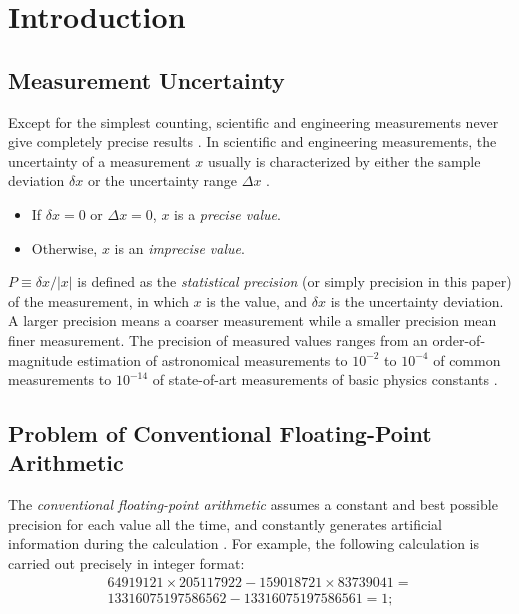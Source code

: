 \documentclass[twoside]{article}
\numberwithin{equation}{section}
\begin{document}
\clearpage
\section{Introduction}
\label{sec: introduction}

\subsection{Measurement Uncertainty \cite{Prev_Precision_Arithmetic}}

Except for the simplest counting, scientific and engineering measurements never give completely precise results \cite{Statistical_Methods}\cite{Precisions_Physical_Measurements}. 
In scientific and engineering measurements, the uncertainty of a measurement $x$ usually is characterized by either the sample deviation $\delta x$ or the uncertainty range $\Delta x$ \cite{Statistical_Methods}\cite{Precisions_Physical_Measurements}.
\begin{itemize}
\item If $\delta x = 0$ or $\Delta x = 0$, $x$ is a \emph{precise value}.

\item Otherwise, $x$ is an \emph{imprecise value}.
\end{itemize}
 
$P \equiv \delta x / |x|$ is defined as the \emph{statistical precision} (or simply precision in this paper) of the measurement, in which $x$ is the value, and $\delta x$ is the uncertainty deviation.
A larger precision means a coarser measurement while a smaller precision mean finer measurement.
The precision of measured values ranges from an order-of-magnitude estimation of astronomical measurements to $10^{-2}$ to $10^{-4}$ of common measurements to $10^{-14}$ of state-of-art measurements of basic physics constants \cite{Basic_Constants_Measurements}.  



\subsection{Problem of Conventional Floating-Point Arithmetic \cite{Prev_Precision_Arithmetic}}

The \emph{conventional floating-point arithmetic} \cite{Computer_Architecture}\cite{Floating_Point_Arithmetic}\cite{Floating_Point_Standard} assumes a constant and best possible precision for each value all the time, and constantly generates artificial information during the calculation \cite{Arithmetic_Digital_Computers}.  
For example, the following calculation is carried out precisely in integer format:
\begin{multline}
\label{eqn: int num calc}
64919121 \times 205117922 - 159018721 \times 83739041=\\
13316075197586562 - 13316075197586561 = 1;
\end{multline}
\end{document}
